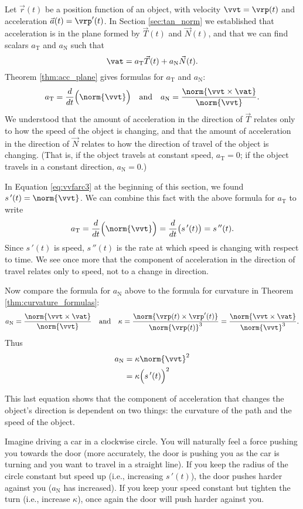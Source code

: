 Let $\vec r(t)$ be a position function of an object, with velocity $\vvt = \vrp(t)$ and acceleration $\vec a(t)=\vrp'(t)$. In Section \ref{sec:tan_norm} we established that acceleration is in the plane formed by $\vec T(t)$ and $\vec N(t)$, and that we can find scalars $a_\text{T}$ and $a_\text{N}$ such that 
$$\vat = a_\text{T}\vec T(t) + a_\text{N}\vec N(t).$$ Theorem \ref{thm:acc_plane} gives formulas for $a_\text{T}$ and $a_\text{N}$:
$$a_\text{T} = \frac{d}{dt}\Big(\norm{\vvt}\Big) \quad \text{and} \quad a_\text{N} = \frac{\norm{\vvt\times \vat}}{\norm{\vvt}}.$$
We understood that the amount of acceleration in the direction of $\vec T$ relates only to how the speed of the object is changing, and that the amount of acceleration in the direction of $\vec N$ relates to how the direction of travel of the object is changing. (That is, if the object travels at constant speed, $a_\text{T}=0$; if the object travels in a constant direction, $a_\text{N}=0$.)


In Equation \eqref{eq:vvfarc3} at the beginning of this section, we found
$s\,'(t) = \norm{\vvt}$. We can combine this fact with the above formula for $a_\text{T}$ to write
$$a_\text{T} = \frac{d}{dt}\Big(\norm{\vvt}\Big) = \frac{d}{dt}\big( s\,'(t)\big) = s\,''(t).$$
Since $s\,'(t)$ is speed, $s\,''(t)$ is the rate at which speed is changing with respect to time. We see once more that the component of acceleration in the direction of travel relates only to speed, not to a change in direction.

Now compare the formula for $a_\text{N}$ above to the formula for curvature in Theorem \ref{thm:curvature_formulas}:
$$a_\text{N} = \frac{\norm{\vvt\times \vat}}{\norm{\vvt}}\quad \text{and}\quad \kappa = \frac{\norm{\vrp(t)\times\vrp'(t)}}{\norm{\vrp(t)}^3}=\frac{\norm{\vvt\times \vat}}{\norm{\vvt}^3} .$$
Thus 
\begin{align}
a_\text{N} &= \kappa \norm{\vvt}^2 \label{eq:curvature_an}\\
				&= \kappa\Big(s\,'(t)\Big)^2\notag
\end{align}

This last equation shows that the component of acceleration that changes the object's direction is dependent on two things: the curvature of the path and the speed of the object.

Imagine driving a car in a clockwise circle. You will naturally feel a force pushing you towards the door (more accurately, the door is pushing you as the car is turning and you want to travel in a straight line). If you keep the radius of the circle constant but speed up (i.e., increasing $s\,'(t)$), the door pushes harder against you ($a_\text{N}$ has increased). If you keep your speed constant but tighten the turn (i.e., increase $\kappa$), once again the door will push harder against you.

